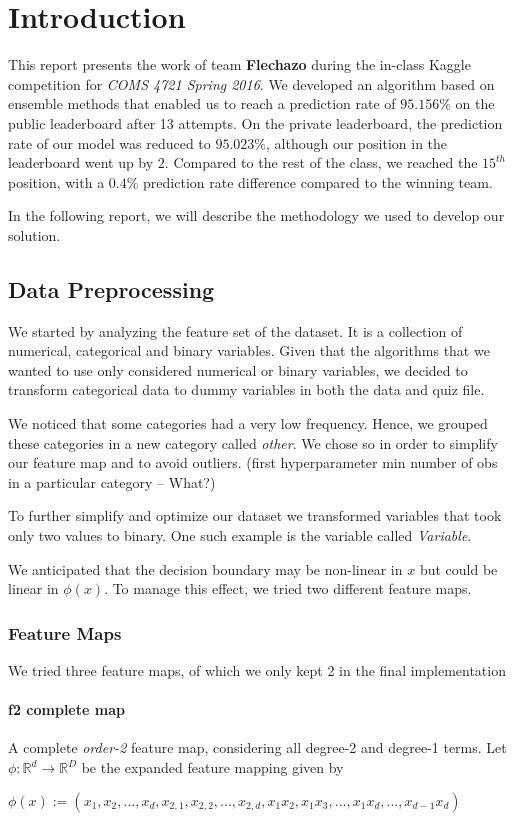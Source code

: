 
\chapter{Introduction}\label{ch:introduction}
This report presents the work of team \textbf{Flechazo} during the in-class Kaggle competition for \textit{COMS 4721 Spring 2016}.
We developed an algorithm based on ensemble methods that enabled us to reach a prediction rate of $95.156\%$ on the public leaderboard after 13 attempts. On the private leaderboard, the prediction rate of our model was reduced to $95.023\%$, although our position in the leaderboard went up by $2$. Compared to the rest of the class, we reached the $15^{th}$ position, with a $0.4\%$ prediction rate difference compared to the winning team.

In the following report, we will describe the methodology we used to develop our solution.

\section{Data Preprocessing}
We started by analyzing the feature set of the dataset. It is a collection of numerical, categorical and binary variables.
Given that the algorithms that we wanted to use only considered numerical or binary variables, we decided to transform categorical data to dummy variables in both the data and quiz file.

We noticed that some categories had a very low frequency. Hence, we grouped these categories in a new category called \textit{other}. We chose so in order to simplify our feature map and to avoid outliers.  (first hyperparameter min number of obs in a particular category -- What?) 

To further simplify and optimize our dataset we transformed variables that took only two values to binary. One such example is the variable called \textit{Variable}.

We anticipated that the decision boundary may be non-linear in $x$ but could be linear in $\phi(x)$.
To manage this effect, we tried two different feature maps.


\subsection{Feature Maps}
We tried three feature maps, of which we only kept 2 in the final implementation
\subsubsection{f2 complete map}
A complete \textit{order-2} feature map, considering all degree-2 and degree-1 terms. Let 
$\phi : \mathbb{R}^d \rightarrow \mathbb{R}^D$ be the expanded feature mapping given by 
\begin{center}
$\phi(x) := (x_1, x_2, ... , x_d, x_{2,1}, x_{2,2}, ... , x_{2,d}, x_1x_2, x_1x_3, ... , x_1x_d, ... ,x_{d-1}x_d)$
 \end{center}
 
